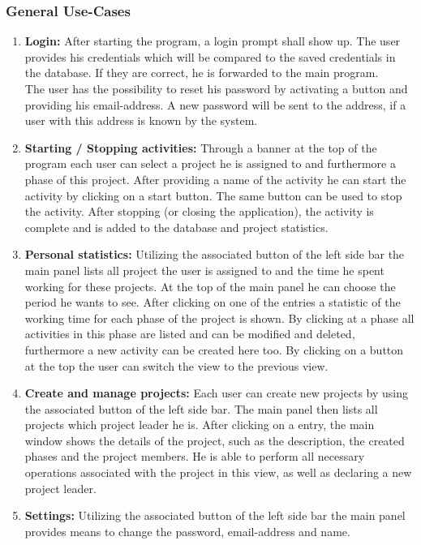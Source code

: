 \subsubsection{General Use-Cases}
\begin{enumerate}
\item \textbf{Login:} After starting the program, a login prompt shall show up. The user provides his credentials which will be compared to the saved credentials in the database. If they are correct, he is forwarded to the main program.\\
The user has the possibility to reset his password by activating a button and providing his email-address. A new password will be sent to the address, if a user with this address is known by the system. 

\item \textbf{Starting / Stopping activities:} Through a banner at the top of the program each user can select a project he is assigned to and furthermore a phase of this project. After providing a name of the activity he can start the activity by clicking on a start button. The same button can be used to stop the activity. After stopping (or closing the application), the activity is complete and is added to the database and project statistics.

\item \textbf{Personal statistics:} Utilizing the associated button of the left side bar the main panel lists all project the user is assigned to and the time he spent working for these projects. At the top of the main panel he can choose the period he wants to see. After clicking on one of the entries a statistic of the working time for each phase of the project is shown. By clicking at a phase all activities in this phase are listed and can be modified and deleted, furthermore a new activity can be created here too. By clicking on a button at the top the user can switch the view to the previous view.

\item \textbf{Create and manage projects:} Each user can create new projects by using the associated button of the left side bar. The main panel then lists all projects which project leader he is. After clicking on a entry, the main window shows the details of the project, such as the description, the created phases and the project members. He is able to perform all necessary operations associated with the project in this view, as well as declaring a new project leader.

\item \textbf{Settings:} Utilizing the associated button of the left side bar the main panel provides means to change the password, email-address and name.
\end{enumerate}
